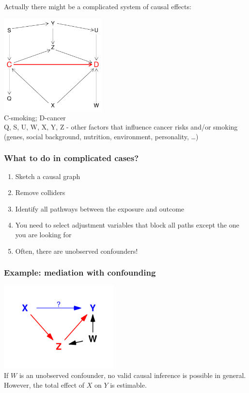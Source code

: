 \documentclass[10pt,dvipsnames,t,handout%
,aspectratio=169%
]{beamer}%
\begin{document}


\begin{frame}
 Actually there might be a complicated system of
causal effects:

{\includegraphics[width=0.4\textwidth]{keeruline2}}\\
{\small  C-smoking; D-cancer \\
Q, S, U, W, X, Y, Z - other factors that influence cancer risks
and/or smoking (genes, social background, nutrition, environment,
personality, \ldots)}
\end{frame}

\begin{frame}
\frametitle{What to do in complicated cases?}

\begin{enumerate}
\item Sketch a causal graph
\item Remove colliders
\item Identify all pathways between the exposure and outcome 
\item You need to select adjustment variables that block all paths except the one you are looking for
\item \alert{Often, there are unobserved confounders!} 
\end{enumerate}
\end{frame}


\begin{frame}
\frametitle{Example: mediation with confounding}
\includegraphics[width=6cm]{mediation_conf}\\[-0.3cm]

 If $W$ is an unobserved confounder, no valid causal inference is possible in general. However, the total effect of $X$ on $Y$ is estimable.

\end{frame}
\end{document}
